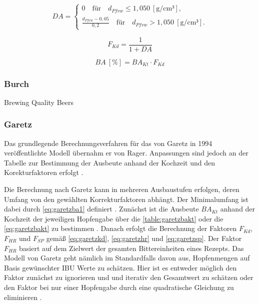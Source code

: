 \documentclass[a4paper,parskip=half]{scrartcl}
\newcommand{\BA}{\mathit{BA}}
\newcommand{\BAKt}{{\mathit{BA}}_{\mathit{Kt}}}
\newcommand{\uden}{\:[\textrm{g/cm³}]}
\newcommand{\uper}{\:[\textrm{\%}]}
\newcommand{\FKd}{F_{\mathit{Kd}}}
\newcommand{\FHR}{F_{\mathit{HR}}}
\newcommand{\FSP}{F_{\mathit{SP}}}
\begin{document}
\begin{equation}
\mathit{DA} = \begin{cases}
0 \quad \textrm{für} \quad d_{\mathit{Pfvw}} \le 1,050 \uden, \\
\frac{d_{\mathit{Pfvw}} - 0,05}{0,2} \quad \textrm{für} \quad d_{\mathit{Pfvw}} > 1,050 \uden.
\end{cases}
\label{eq:ragerga}
\end{equation}

\begin{equation}
\FKd = \frac{1}{1 + \mathit{DA}}
\label{eq:ragerfkd}
\end{equation}


\begin{equation}
\BA \uper = \BAKt \cdot \FKd
\label{eq:ragerba}
\end{equation}

\subsubsection*{Burch}
Brewing Quality Beers

\subsubsection*{Garetz}

Das grundlegende Berechnungsverfahren für das von Garetz in 1994
veröffentlichte Modell übernahm er von Rager. Anpassungen sind jedoch an
der Tabelle zur Bestimmung der Ausbeute anhand der Kochzeit und den
Korekturfaktoren erfolgt \parencite[134-144]{Garetz1994}.

Die Berechnung nach Garetz kann in mehreren Ausbaustufen erfolgen,
deren Umfang von den gewählten Korrekturfaktoren abhängt.
Der Minimalumfang ist dabei durch \autoref{eq:garetzba1} definiert
\parencite[137]{Garetz1994}.
Zunächst ist die Ausbeute $\BAKt$ anhand der Kochzeit der jeweiligen 
Hopfengabe über die \autoref{table:garetzbakt} oder die \autoref{eq:garetzbakt} zu bestimmen \parencite{Steinmeyer2021}. Danach erfolgt die
Berechnung der Faktoren $\FKd$, $\FHR$ und $\FSP$ gemäß
\autoref{eq:garetzkd}, \autoref{eq:garetzhr} und \autoref{eq:garetzsp}.
Der Faktor $\FHR$ basiert auf dem Zielwert der gesamten Bittereinheiten
eines Rezepts. Das Modell von Garetz geht nämlich im Standardfalls
davon aus, Hopfenmengen auf Basis gewünschter IBU Werte zu schätzen.
Hier ist es entweder möglich den Faktor zunächst zu ignorieren und
und iterativ den Gesamtwert zu schätzen oder den Faktor bei nur
einer Hopfengabe durch eine quadratische Gleichung zu eliminieren      \parencite[63]{Hall1997}.
\end{document}
